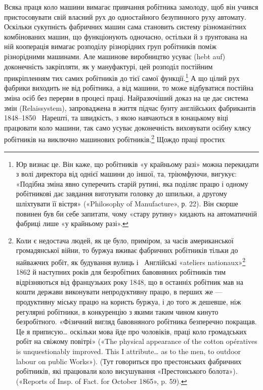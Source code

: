Всяка праця коло машини вимагає привчання робітника
замолоду, щоб він учився пристосовувати свій власний рух до
одностайного безупинного руху автомату. Оскільки сукупність
фабричних машин сама становить систему різноманітних комбінованих
машин, що функціонують одночасно, остільки й з ґрунтована
на ній кооперація вимагає розподілу різнорідних груп
робітників поміж різнорідними машинами. Але машинове виробництво
усуває (hebt auf) доконечність закріпляти, як у мануфактурі,
цей розподіл постійним прикріпленням тих самих робітників
до тієї самої функції.\footnote{
Юр визнає це. Він каже, що робітників «у крайньому разі» можна
перекидати з волі директора від однієї машини до іншої, та, тріюмфуючи,
вигукує: «Подібна зміна явно суперечить старій рутині, яка поділяє
працю і одному робітникові дає завдання виготувати головку до шпильки,
а другому шліхтувати її вістря» («Philosophy of Manufacture», р. 22).
Він скорше повинен був би себе запитати, чому «стару рутину» кидають
на автоматичній фабриці лише «у крайньому разі».
} А що цілий рух фабрики виходить не від
робітника, а від машини, то може відбуватися постійна зміна
осіб без перерви в процесі праці. Найразючіший доказ на це дає
система змін (Relaissystem), запроваджена в життя підчас бунту
англійських фабрикантів 1848--1850~ Нарешті, та швидкість,
з якою навчаються в юнацькому віці працювати коло машини,
так само усуває доконечність виховувати осібну клясу робітників
на виключно машинових робітників.\footnote{
Коли є недостача людей, як це було, приміром, за часів американської
громадянської війни, то буржуа вживає фабричних робітників
тільки до найважчих робіт, як будування вулиць і~ Англійські
«ateliers nationaux»\footnote*{
— національні майстерні. \emph{Ред.}
} 1862 й наступних років для безробітних бавовняних
робітників тим відрізняються від французьких року 1848, що в останніх
робітник мав на кошти держави виконувати непродуктивну працю, в
перших же — продуктивну міську працю на користь буржуа, і до того ж
дешевше, ніж регулярні робітники, в конкуренцію з якими таким чином
кинуто безробітного. «Фізичний вигляд бавовняного робітника безперечно
покращав. Це я приписую\dots{} оскільки мова йде про чоловіків, праці
коло громадських робіт на свіжому повітрі» («The physical appearance
of the cotton opératives is unquestionably improved. This I attribute\dots{}
as to the men, to outdoor labour on public Works»). (Тут говориться
про престонських фабричних робітників, які працювали коло висушування
«Престонського болота»). («Reports of Insp. of Fact. for October
1865», p. 59).
} Щождо праці простих
\parbreak{}  %
